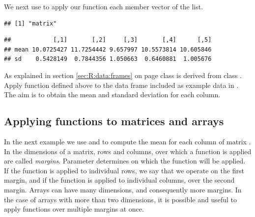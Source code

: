 \documentclass[krantz2]{krantz}\usepackage{knitr}%
\begin{document}
\begin{explainbox}
We next use  to apply our function each member vector of the list.

\begin{knitrout}\footnotesize
{}\color{fgcolor}\begin{kframe}
\begin{alltt}
 \hlkwb{<-} \hlstd{(} 
                  
                  \hlstd{=} \hlstd{(} \hlstd{=} \hlstd{,}  \hlstd{=} \hlstd{),}
                  \hlstd{=} \hlstd{)}
\end{alltt}
\begin{verbatim}
## [1] "matrix"
\end{verbatim}
\begin{alltt}
\end{alltt}
\begin{verbatim}
##            [,1]       [,2]     [,3]       [,4]      [,5]
## mean 10.0725427 11.7254442 9.657997 10.5573814 10.605846
## sd    0.5428149  0.7844356 1.050663  0.6460881  1.005676
\end{verbatim}
\end{kframe}
\end{knitrout}
\end{explainbox}

\begin{playground}
As explained in section \ref{sec:R:data:frames} on page \pageref{sec:R:data:frames} class  is derived from class . Apply function  defined above to the data frame  included as example data in \Rlang. The aim is to obtain the mean and standard deviation for each column.
\end{playground}

\subsection{Applying functions to matrices and arrays}
In the next example we use  and  to compute the mean for each column of matrix . In \Rlang the dimensions of a matrix, rows and columns, over which a function is applied are called \emph{margins}. Parameter  determines on which the function will be applied. If the function is applied to individual rows, we say that we operate on the first margin, and if the function is applied to individual columns, over the second margin. Arrays can have many dimensions, and consequently more margins. In the case of arrays with more than two dimensions, it is possible and useful to apply functions over multiple margins at once.
\end{document}
